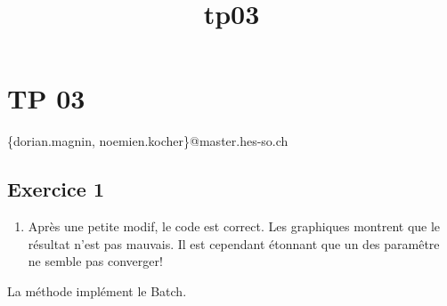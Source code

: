 \documentclass[11pt]{article}
\title{tp03}
\providecommand{\tightlist}{%
      \setlength{\itemsep}{0pt}\setlength{\parskip}{0pt}}
\begin{document}
    
    
    \maketitle
    
    

    
    \section{TP 03}\label{tp-03}

\{dorian.magnin, noemien.kocher\}@master.hes-so.ch

\subsection{Exercice 1}\label{exercice-1}

\begin{enumerate}
\def\labelenumi{\alph{enumi})}
\tightlist
\item
  Après une petite modif, le code est correct. Les graphiques montrent
  que le résultat n'est pas mauvais. Il est cependant étonnant que un
  des paramêtre ne semble pas converger!
\end{enumerate}

La méthode implément le Batch.
\end{document}
